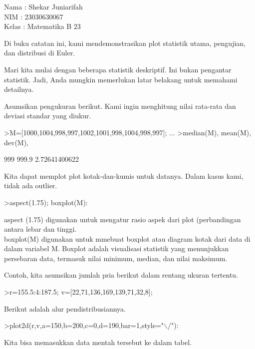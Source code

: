 \documentclass{article}
\begin{document}
\begin{eulernotebook}
\begin{eulercomment}
Nama : Shekar Juniarifah\\
NIM : 23030630067\\
Kelas : Matematika B 23

\begin{eulercomment}
\begin{eulercomment}
Di buku catatan ini, kami mendemonstrasikan plot statistik utama,
pengujian, dan distribusi di Euler.

Mari kita mulai dengan beberapa statistik deskriptif. Ini bukan
pengantar statistik. Jadi, Anda mungkin memerlukan latar belakang
untuk memahami detailnya.

Asumsikan pengukuran berikut. Kami ingin menghitung nilai rata-rata
dan deviasi standar yang diukur.
\end{eulercomment}
\begin{eulerprompt}
>M=[1000,1004,998,997,1002,1001,998,1004,998,997]; ...
>median(M), mean(M), dev(M),
\end{eulerprompt}
\begin{euleroutput}
  999
  999.9
  2.72641400622
\end{euleroutput}
\begin{eulercomment}
Kita dapat memplot plot kotak-dan-kumis untuk datanya. Dalam kasus
kami, tidak ada outlier.
\end{eulercomment}
\begin{eulerprompt}
>aspect(1.75); boxplot(M):
\end{eulerprompt}
\begin{eulercomment}
aspect (1.75) digunakan untuk mengatur rasio aspek dari plot
(perbandingan antara lebar dan tinggi.\\
boxplot(M) digunakan untuk mmebuat boxplot atau diagram kotak dari
data di dalam variabel M. Boxplot adalah visualisasi statistik yang
menunjukkan persebaran data, termasuk nilai minimum, median, dan nilai
maksimum.

Contoh, kita asumsikan jumlah pria berikut dalam rentang ukuran
tertentu.
\end{eulercomment}
\begin{eulerprompt}
>r=155.5:4:187.5; v=[22,71,136,169,139,71,32,8];
\end{eulerprompt}
\begin{eulercomment}
Berikut adalah alur pendistribusiannya.
\end{eulercomment}
\begin{eulerprompt}
>plot2d(r,v,a=150,b=200,c=0,d=190,bar=1,style="\(\backslash\)/"):
\end{eulerprompt}
\begin{eulercomment}
Kita bisa memasukkan data mentah tersebut ke dalam tabel.


\end{eulercomment}
\end{eulercomment}
\end{eulercomment}
\end{eulernotebook}
\end{document}

